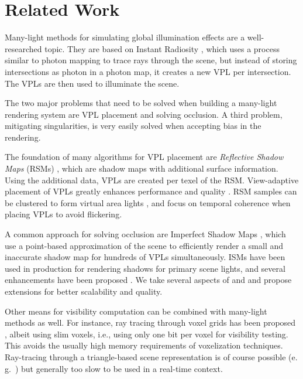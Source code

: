 \section{Related Work}

Many-light methods for simulating global illumination effects are a well-researched topic. They are based on Instant Radiosity \cite{Keller:1997:InstantRadiosity}, which uses a process similar to photon mapping to trace rays through the scene, but instead of storing intersections as photon in a photon map, it creates a new VPL per intersection. The VPLs are then used to illuminate the scene.

The two major problems that need to be solved when building a many-light rendering system are VPL placement and solving occlusion. A third problem, mitigating singularities, is very easily solved when accepting bias in the rendering.


The foundation of many algorithms for VPL placement are \textit{Reflective Shadow Maps} (RSMs) \cite{Dachsbacher:2005:RSM}, which are shadow maps with additional surface information. Using the additional data, VPLs are created per texel of the RSM. View-adaptive placement of VPLs greatly enhances performance and quality \cite{ritschel2011ismsViewAdaptive}. RSM samples can be clustered to form virtual area lights \cite{prutkin2012reflective}, and \cite{hedman2016sequential} focus on temporal coherence when placing VPLs to avoid flickering.

A common approach for solving occlusion are Imperfect Sha\-dow Maps \cite{ritschel2008ism}, which use a point-based approximation of the scene to efficiently render a small and inaccurate shadow map for hundreds of VPLs simultaneously. ISMs have been used in production for rendering shadows for primary scene lights\cite{evans2015dreams}, and several enhancements have been proposed \cite{ritschel2011ismsViewAdaptive, hollander2011manylods, barak2013temporally}. We take several aspects of \cite{ritschel2008ism} and \cite{barak2013temporally} and propose extensions for better scalability and quality.

Other means for visibility computation can be combined with many-light methods as well. For instance, ray tracing through voxel grids has been proposed \cite{sugihara2014layered, sun2015manylightsSVO, Chen:2016:Compactvoxels}, albeit using slim voxels, i.e., using only one bit per voxel for visibility testing. This avoids the usually high memory requirements of voxelization techniques. Ray-tracing through a triangle-based scene representation is of course possible (e.\,g.\ \cite{segovia2006bidirectional}) but generally too slow to be used in a real-time context.

